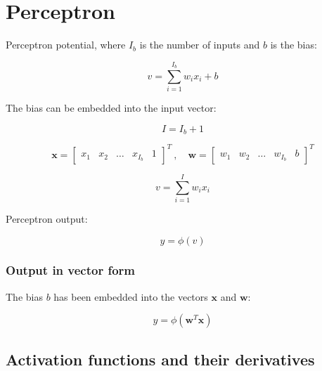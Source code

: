 
\chapter{Perceptron}\label{ch:perceptron}

Perceptron potential, where $I_b$ is the number of inputs and $b$ is the bias:

\begin{equation}\label{eq:perceptron-potential}
    v = \sum_{i=1}^{I_b} w_i x_i + b
\end{equation}

The bias can be embedded into the input vector:

\begin{equation}\label{eq:m-plus-one-0}
    I = I_b + 1
\end{equation}

\begin{equation}\label{eq:perceptron-potential-2}
    \bm{x} =
    \begin{bmatrix}
        x_1 & x_2 & \ldots & x_{I_b} & 1
    \end{bmatrix}^T \ , \quad
    \bm{w} =
    \begin{bmatrix}
        w_1 & w_2 & \ldots & w_{I_b} & b
    \end{bmatrix}^T
\end{equation}

\begin{equation}\label{eq:perceptron-potential-3}
v = \sum_{i=1}^{I} w_i x_i
\end{equation}

Perceptron output:

\begin{equation}\label{eq:perceptron-output}
    y = \phi (v)
\end{equation}


\subsection{Output in vector form}\label{subsec:vector-form}

The bias $b$ has been embedded into the vectors $\bm{x}$ and $\bm{w}$:

\begin{equation}\label{eq:perceptron-vector}
y = \phi (\bm{w}^T \bm{x})
\end{equation}


\section{Activation functions and their derivatives}\label{sec:activation-functions}


